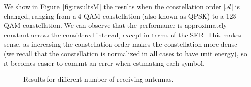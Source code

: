\documentclass[a4paper]{article}
\def\Acal{\mathcal{A}}
\begin{document}
We show in Figure~\ref{fig:resultsM} the results when the constellation order $|\Acal|$ is changed, ranging from a 4-QAM constellation (also known as QPSK) to a 128-QAM constellation. We can observe that the performance is approximately constant across the considered interval, except in terms of the SER. This makes sense, as increasing the constellation order makes the constellation more dense (we recall that the constellation is normalized in all cases to have unit energy), so it becomes easier to commit an error when estimating each symbol.
%
\begin{figure}[th]
\centering
{}
\vspace*{-3mm}
\caption{Results for different number of receiving antennas.}\label{fig:resultsNr}
\vspace*{-4mm}
\end{figure}
%
\end{document}
